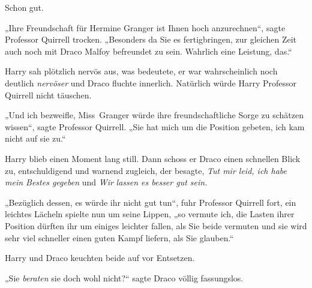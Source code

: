 Schon gut.

„Ihre Freundschaft für Hermine Granger ist Ihnen hoch anzurechnen“, sagte Professor Quirrell trocken. „Besonders da Sie es fertigbringen, zur gleichen Zeit auch noch mit Draco Malfoy befreundet zu sein. Wahrlich eine Leistung, das.“

Harry sah plötzlich nervös aus, was bedeutete, er war wahrscheinlich noch deutlich \emph{nervöser} und Draco fluchte innerlich. Natürlich würde Harry Professor Quirrell nicht täuschen.

„Und ich bezweifle, Miss~Granger würde ihre freundschaftliche Sorge zu schätzen wissen“, sagte Professor Quirrell. „Sie hat mich um die Position gebeten, ich kam nicht auf sie zu.“

Harry blieb einen Moment lang still. Dann schoss er Draco einen schnellen Blick zu, entschuldigend und warnend zugleich, der besagte, \emph{Tut mir leid, ich habe mein Bestes gegeben} und \emph{Wir} \emph{lassen es besser gut sein.}

„Bezüglich dessen, es würde ihr nicht gut tun“, fuhr Professor Quirrell fort, ein leichtes Lächeln spielte nun um seine Lippen, „so vermute ich, die Lasten ihrer Position dürften ihr um einiges leichter fallen, als Sie beide vermuten und sie wird sehr viel schneller einen guten Kampf liefern, als Sie glauben.“

Harry und Draco keuchten beide auf vor Entsetzen.

„Sie \emph{beraten} sie doch wohl nicht?“ sagte Draco völlig fassungslos.

